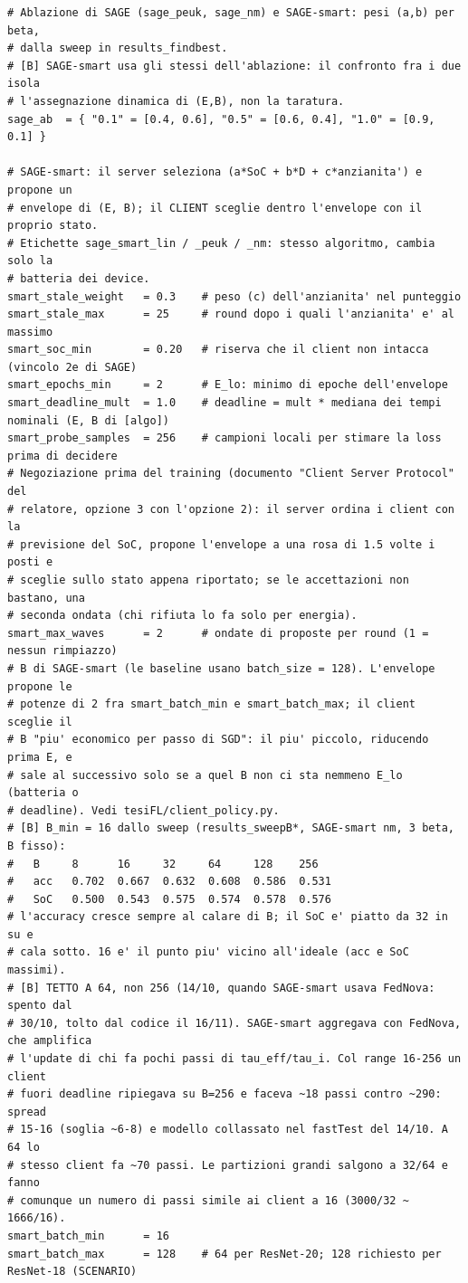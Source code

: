 \documentclass[11pt,a4paper]{article}
\begin{document}
\begin{lstlisting}[style=toml,firstnumber=290,caption={\texttt{tesifl/experiment.toml}, lines 290--350}]
# Ablazione di SAGE (sage_peuk, sage_nm) e SAGE-smart: pesi (a,b) per beta,
# dalla sweep in results_findbest.
# [B] SAGE-smart usa gli stessi dell'ablazione: il confronto fra i due isola
# l'assegnazione dinamica di (E,B), non la taratura.
sage_ab  = { "0.1" = [0.4, 0.6], "0.5" = [0.6, 0.4], "1.0" = [0.9, 0.1] }

# SAGE-smart: il server seleziona (a*SoC + b*D + c*anzianita') e propone un
# envelope di (E, B); il CLIENT sceglie dentro l'envelope con il proprio stato.
# Etichette sage_smart_lin / _peuk / _nm: stesso algoritmo, cambia solo la
# batteria dei device.
smart_stale_weight   = 0.3    # peso (c) dell'anzianita' nel punteggio
smart_stale_max      = 25     # round dopo i quali l'anzianita' e' al massimo
smart_soc_min        = 0.20   # riserva che il client non intacca (vincolo 2e di SAGE)
smart_epochs_min     = 2      # E_lo: minimo di epoche dell'envelope
smart_deadline_mult  = 1.0    # deadline = mult * mediana dei tempi nominali (E, B di [algo])
smart_probe_samples  = 256    # campioni locali per stimare la loss prima di decidere
# Negoziazione prima del training (documento "Client Server Protocol" del
# relatore, opzione 3 con l'opzione 2): il server ordina i client con la
# previsione del SoC, propone l'envelope a una rosa di 1.5 volte i posti e
# sceglie sullo stato appena riportato; se le accettazioni non bastano, una
# seconda ondata (chi rifiuta lo fa solo per energia).
smart_max_waves      = 2      # ondate di proposte per round (1 = nessun rimpiazzo)
# B di SAGE-smart (le baseline usano batch_size = 128). L'envelope propone le
# potenze di 2 fra smart_batch_min e smart_batch_max; il client sceglie il
# B "piu' economico per passo di SGD": il piu' piccolo, riducendo prima E, e
# sale al successivo solo se a quel B non ci sta nemmeno E_lo (batteria o
# deadline). Vedi tesiFL/client_policy.py.
# [B] B_min = 16 dallo sweep (results_sweepB*, SAGE-smart nm, 3 beta, B fisso):
#   B     8      16     32     64     128    256
#   acc   0.702  0.667  0.632  0.608  0.586  0.531
#   SoC   0.500  0.543  0.575  0.574  0.578  0.576
# l'accuracy cresce sempre al calare di B; il SoC e' piatto da 32 in su e
# cala sotto. 16 e' il punto piu' vicino all'ideale (acc e SoC massimi).
# [B] TETTO A 64, non 256 (14/10, quando SAGE-smart usava FedNova: spento dal
# 30/10, tolto dal codice il 16/11). SAGE-smart aggregava con FedNova, che amplifica
# l'update di chi fa pochi passi di tau_eff/tau_i. Col range 16-256 un client
# fuori deadline ripiegava su B=256 e faceva ~18 passi contro ~290: spread
# 15-16 (soglia ~6-8) e modello collassato nel fastTest del 14/10. A 64 lo
# stesso client fa ~70 passi. Le partizioni grandi salgono a 32/64 e fanno
# comunque un numero di passi simile ai client a 16 (3000/32 ~ 1666/16).
smart_batch_min      = 16
smart_batch_max      = 128    # 64 per ResNet-20; 128 richiesto per ResNet-18 (SCENARIO)


\end{lstlisting}
\end{document}
